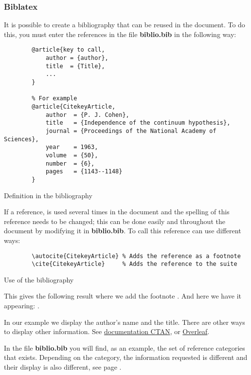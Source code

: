 \subsubsection{Biblatex}
It is possible to create a bibliography that can be reused in the document.
To do this, you must enter the references in the file \textbf{biblio.bib} in the following way:
\begin{code}
    \begin{verbatim}
        @article{key to call,
            author = {author},
            title  = {Title},
            ...
        }

        % For example
        @article{CitekeyArticle,
            author  = {P. J. Cohen},
            title   = {Independence of the continuum hypothesis},
            journal = {Proceedings of the National Academy of Sciences},
            year    = 1963,
            volume  = {50},
            number  = {6},
            pages   = {1143--1148}
        }
\end{verbatim}
    \caption{Definition in the bibliography}
\end{code}

If a reference, is used several times in the document and the spelling of this reference
needs to be changed; this can be done easily and throughout the document by modifying it in
\textbf{biblio.bib}.
To call this reference can use different ways:
\begin{code}
    \begin{verbatim}
        \autocite{CitekeyArticle} % Adds the reference as a footnote
        \cite{CitekeyArticle}     % Adds the reference to the suite
\end{verbatim}
    \caption{Use of the bibliography}
\end{code}

This gives the following result where we add the footnote \autocite{CitekeyArticle}.
And here we have it appearing: \cite{CitekeyArticle}. \newline

In our example we display the author's name and the title. There are other ways to display other
information. See
\href{https://mirror.ibcp.fr/pub/CTAN/macros/latex/contrib/biblatex/doc/biblatex.pdf#subsection.3.9}{documentation CTAN},
or \href{https://fr.overleaf.com/learn/latex/Bibliography_management_with_bibtex}{Overleaf}.
\newline

In the file \textbf{biblio.bib} you will find, as an example, the set of reference categories that
exists. Depending on the category, the information requested is different and their display is also
different, see page \pageref{bibliography}.

